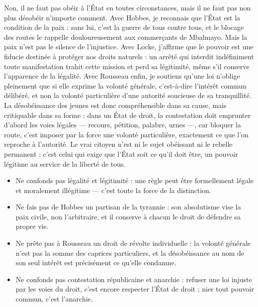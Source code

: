 \documentclass[11pt]{article}
\newcommand{\cle}[1]{{\popxbold\color{popdark}#1}}
\begin{document}
\begin{exoresolu}
\guillemotleft Non, il ne faut pas obéir à l'État en toutes circonstances, mais il ne faut pas non plus désobéir n'importe comment. Avec Hobbes, je reconnais que l'État est la condition de la paix : sans lui, c'est la guerre de tous contre tous, et le blocage des routes le rappelle douloureusement aux commerçants de Mbalmayo. Mais la paix n'est pas le silence de l'injustice. Avec Locke, j'affirme que le pouvoir est une fiducie destinée à protéger nos droits naturels : un arrêté qui interdit indéfiniment toute manifestation trahit cette mission et perd sa légitimité, même s'il conserve l'apparence de la légalité. Avec Rousseau enfin, je soutiens qu'une loi n'oblige pleinement que si elle exprime la volonté générale, c'est-à-dire l'intérêt commun délibéré, et non la volonté particulière d'une autorité soucieuse de sa tranquillité. La désobéissance des jeunes est donc compréhensible dans sa cause, mais critiquable dans sa forme : dans un État de droit, la contestation doit emprunter d'abord les voies légales — recours, pétition, palabre, urnes —, car bloquer la route, c'est imposer par la force une volonté particulière, exactement ce que l'on reproche à l'autorité. Le vrai citoyen n'est ni le sujet obéissant ni le rebelle permanent : c'est celui qui exige que l'État soit ce qu'il doit être, un pouvoir légitime au service de la liberté de tous. \guillemotright
\end{exoresolu}

\begin{attention}
\begin{itemize}
\item Ne confonds pas \cle{légalité} et \cle{légitimité} : une règle peut être formellement légale et moralement illégitime — c'est toute la force de la distinction.
\item Ne fais pas de Hobbes un partisan de la tyrannie : son absolutisme vise la paix civile, non l'arbitraire, et il conserve à chacun le droit de défendre sa propre vie.
\item Ne prête pas à Rousseau un droit de révolte individuelle : la volonté générale n'est pas la somme des caprices particuliers, et la désobéissance au nom de son seul intérêt est précisément ce qu'elle condamne.
\item Ne confonds pas contestation républicaine et anarchie : refuser une loi injuste par les voies du droit, c'est encore respecter l'État de droit ; nier tout pouvoir commun, c'est l'anarchie.
\end{itemize}
\end{attention}
\end{document}
